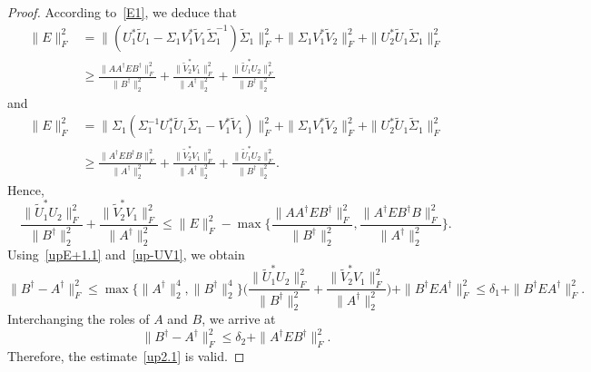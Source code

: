 \documentclass[11pt]{article}
\begin{document}
\begin{proof}
According to~\eqref{E1}, we deduce that
\begin{align*}
\|E\|_{F}^{2}&=\|(U_{1}^{\ast}\widetilde{U}_{1}-\Sigma_{1}V_{1}^{\ast}\widetilde{V}_{1}\widetilde{\Sigma}_{1}^{-1})\widetilde{\Sigma}_{1}\|_{F}^{2}+\|\Sigma_{1}V_{1}^{\ast}\widetilde{V}_{2}\|_{F}^{2}+\|U_{2}^{\ast}\widetilde{U}_{1}\widetilde{\Sigma}_{1}\|_{F}^{2}\\
&\geq\frac{\|AA^{\dagger}EB^{\dagger}\|_{F}^{2}}{\|B^{\dagger}\|_{2}^{2}}+\frac{\|\widetilde{V}_{2}^{\ast}V_{1}\|_{F}^{2}}{\|A^{\dagger}\|_{2}^{2}}+\frac{\|\widetilde{U}_{1}^{\ast}U_{2}\|_{F}^{2}}{\|B^{\dagger}\|_{2}^{2}}
\end{align*}
and
\begin{align*}
\|E\|_{F}^{2}&=\|\Sigma_{1}(\Sigma_{1}^{-1}U_{1}^{\ast}\widetilde{U}_{1}\widetilde{\Sigma}_{1}-V_{1}^{\ast}\widetilde{V}_{1})\|_{F}^{2}+\|\Sigma_{1}V_{1}^{\ast}\widetilde{V}_{2}\|_{F}^{2}+\|U_{2}^{\ast}\widetilde{U}_{1}\widetilde{\Sigma}_{1}\|_{F}^{2}\\
&\geq\frac{\|A^{\dagger}EB^{\dagger}B\|_{F}^{2}}{\|A^{\dagger}\|_{2}^{2}}+\frac{\|\widetilde{V}_{2}^{\ast}V_{1}\|_{F}^{2}}{\|A^{\dagger}\|_{2}^{2}}+\frac{\|\widetilde{U}_{1}^{\ast}U_{2}\|_{F}^{2}}{\|B^{\dagger}\|_{2}^{2}}.
\end{align*}
Hence,
\begin{equation}\label{up-UV1}
\frac{\|\widetilde{U}_{1}^{\ast}U_{2}\|_{F}^{2}}{\|B^{\dagger}\|_{2}^{2}}+\frac{\|\widetilde{V}_{2}^{\ast}V_{1}\|_{F}^{2}}{\|A^{\dagger}\|_{2}^{2}}\leq\|E\|_{F}^{2}-\max\bigg\{\frac{\|AA^{\dagger}EB^{\dagger}\|_{F}^{2}}{\|B^{\dagger}\|_{2}^{2}},\frac{\|A^{\dagger}EB^{\dagger}B\|_{F}^{2}}{\|A^{\dagger}\|_{2}^{2}}\bigg\}.
\end{equation}
Using~\eqref{upE+1.1} and~\eqref{up-UV1}, we obtain
\begin{displaymath}
\|B^{\dagger}-A^{\dagger}\|_{F}^{2}\leq\max\big\{\|A^{\dagger}\|_{2}^{4},\|B^{\dagger}\|_{2}^{4}\big\}\bigg(\frac{\|\widetilde{U}_{1}^{\ast}U_{2}\|_{F}^{2}}{\|B^{\dagger}\|_{2}^{2}}+\frac{\|\widetilde{V}_{2}^{\ast}V_{1}\|_{F}^{2}}{\|A^{\dagger}\|_{2}^{2}}\bigg)+\|B^{\dagger}EA^{\dagger}\|_{F}^{2}\leq\delta_{1}+\|B^{\dagger}EA^{\dagger}\|_{F}^{2}.
\end{displaymath}
Interchanging the roles of $A$ and $B$, we arrive at
\begin{displaymath}
\|B^{\dagger}-A^{\dagger}\|_{F}^{2}\leq\delta_{2}+\|A^{\dagger}EB^{\dagger}\|_{F}^{2}.
\end{displaymath}
Therefore, the estimate~\eqref{up2.1} is valid.


\end{proof}
\end{document}
